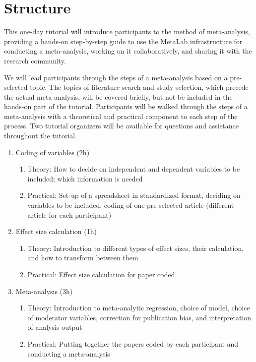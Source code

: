 \documentclass[10pt,letterpaper]{article}
\begin{document}
\section{Structure}

This one-day tutorial will introduce participants to the method of meta-analysis, providing a hands-on step-by-step guide to use the MetaLab infrastructure for conducting a meta-analysis, working on it collaboratively, and sharing it with the research community.

We will lead participants through the steps of a meta-analysis based on a pre-selected topic. The topics of literature search and study selection, which precede the actual meta-analysis, will be covered briefly, but not  be included in the hands-on part of the tutorial. Participants will be walked through the steps of a meta-analysis with a theoretical and practical component to each step of the process. Two tutorial organizers will be available for questions and assistance throughout the tutorial.

\begin{enumerate}
    \item Coding of variables (2h)
    \begin{enumerate}
        \item Theory: How to decide on independent and dependent variables to be included; which information is needed
        \item Practical: Set-up of a spreadsheet in standardized format, deciding on variables to be included, coding of one pre-selected article (different article for each participant)
    \end{enumerate}
    \item Effect size calculation (1h)
    \begin{enumerate}
        \item Theory: Introduction to different types of effect sizes, their calculation, and how to transform between them
        \item Practical: Effect size calculation for paper coded
    \end{enumerate}
    \item Meta-analysis (3h)
    \begin{enumerate}
        \item Theory: Introduction to meta-analytic regression, choice of model, choice of moderator variables, correction for publication bias, and interpretation of analysis output
       \item Practical: Putting together the papers coded by each participant and conducting a meta-analysis
        \end{enumerate}
\end{enumerate}
\end{document}
